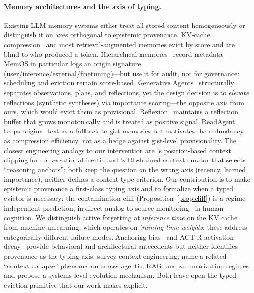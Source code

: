 \documentclass{article}
\begin{document}
\paragraph{Memory architectures and the axis of typing.}
Existing LLM memory systems either treat all stored content homogeneously or distinguish it on axes orthogonal to epistemic provenance. KV-cache compression~\citep{zhang2023h2o,xiao2024streamingllm,li2024snapkv} and most retrieval-augmented memories evict by score and are blind to who produced a token. Hierarchical memories~\citep{packer2023memgpt,li2025memos,memagent2026} record metadata---MemOS in particular logs an origin signature (user/inference/external/finetuning)---but use it for audit, not for governance: scheduling and eviction remain score-based. Generative Agents~\citep{park2023generative} structurally separates observations, plans, and reflections, yet the design decision is to \emph{elevate} reflections (synthetic syntheses) via importance scoring---the opposite axis from ours, which would evict them as provisional. Reflexion~\citep{shinn2023reflexion} maintains a reflection buffer that grows monotonically and is treated as positive signal. ReadAgent~\citep{lee2024readagent} keeps original text as a fallback to gist memories but motivates the redundancy as compression efficiency, not as a hedge against gist-level provisionality. The closest engineering analogs to our intervention are \citet{li2026inertia}'s position-based context clipping for conversational inertia and \citet{activecontextcuration2026}'s RL-trained context curator that selects ``reasoning anchors''; both keep the question on the wrong axis (recency, learned importance), neither defines a content-type criterion. Our contribution is to make epistemic provenance a first-class typing axis and to formalize when a typed evictor is necessary: the contamination cliff (Proposition~\ref{prop:cliff}) is a regime-independent prediction, in direct analog to source monitoring~\citep{johnson1993source} in human cognition. We distinguish active forgetting at \emph{inference time} on the KV cache from machine unlearning, which operates on \emph{training-time weights}; these address categorically different failure modes. Anchoring bias~\citep{tversky1974anchoring} and ACT-R activation decay~\citep{anderson1998actrarch} provide behavioral and architectural antecedents but neither identifies provenance as the typing axis. \citet{khattab2025contexteng} survey context engineering; \citet{ace2025} name a related ``context collapse'' phenomenon across agentic, RAG, and summarization regimes and propose a systems-level evolution mechanism. Both leave open the typed-eviction primitive that our work makes explicit.
\end{document}

